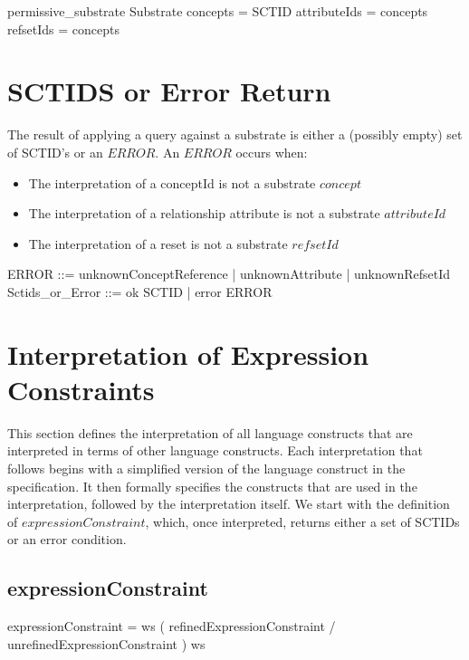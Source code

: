 \documentclass{article}
\def\bnf#1{{\scriptsize {{#1}} }}
\begin{document}
 
 \begin{schema}{permissive\_substrate}
    Substrate
\where
    concepts = SCTID \land attributeIds = concepts \land refsetIds = concepts 
\end{schema}
   


\section{SCTIDS or Error Return}
The result of applying a query against a substrate is either a (possibly empty) set of SCTID's or an $ERROR$.  An $ERROR$ occurs when:
\begin{itemize}[noitemsep,nolistsep]
\item The interpretation of a conceptId is not a substrate $concept$
\item The interpretation of a relationship attribute is not a substrate $attributeId$
\item The interpretation of a reset is not a substrate $refsetId$
\end{itemize}


\begin{zed}  
ERROR ::= unknownConceptReference | unknownAttribute | unknownRefsetId 
\also
Sctids\_or\_Error ::= ok \ldata \power SCTID \rdata | error \ldata ERROR \rdata 
\end{zed}

\section{Interpretation of Expression Constraints}
This section defines the interpretation of all language constructs that are interpreted in terms of other language constructs.  Each interpretation that follows begins with a simplified version
of the language construct in the specification.  It then formally specifies the constructs that are used in the interpretation, followed by the interpretation itself. We start with the definition 
of $expressionConstraint$, which, once interpreted, returns either a set of SCTIDs or an error condition.
\subsection{expressionConstraint}
\begin{framed}
\noindent
\bnf{expressionConstraint = ws ( refinedExpressionConstraint / unrefinedExpressionConstraint ) ws}
\end{framed}
\end{document}
